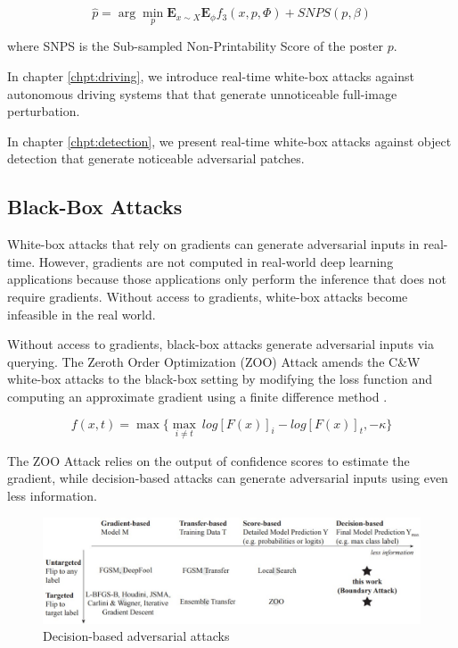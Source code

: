 $$\hat{p} = \arg \underset{p}{\min}\mathbf{E}_{x \sim X}\mathbf{E}_\phi f_3(x, p, \Phi) + SNPS(p, \beta)$$

where SNPS is the Sub-sampled Non-Printability Score of the poster $p$.

In chapter \ref{chpt:driving}, we introduce real-time white-box attacks against autonomous driving systems that that generate unnoticeable full-image perturbation.

In chapter \ref{chpt:detection}, we present real-time white-box attacks against object detection that generate noticeable adversarial patches.


\subsection{Black-Box Attacks}
\label{sec:blackbox_attack}

White-box attacks that rely on gradients can generate adversarial inputs in real-time. However, gradients are not computed in real-world deep learning applications because those applications only perform the inference that does not require gradients. Without access to gradients, white-box attacks become infeasible in the real world.

Without access to gradients, black-box attacks generate adversarial inputs via querying. The Zeroth Order Optimization (ZOO) Attack amends the C\&W white-box attacks to the black-box setting by modifying the loss function and computing an approximate gradient using a finite difference method \citep{Chen_2017}.

$$f(x,t) = \max \{ {\underset{i \neq t}{\max}\ log[F(x)]_i - log[F(x)]_t, -\kappa } \}$$

The ZOO Attack relies on the output of confidence scores to estimate the gradient, while decision-based attacks can generate adversarial inputs using even less information.

\begin{figure}[H]
\centering
\includegraphics[scale=0.45]{figures/chapter_intro/query-efficient.jpg}
\caption{Decision-based adversarial attacks \citep{brendel2018decisionbased}}
\label{fig.query}
\end{figure}

